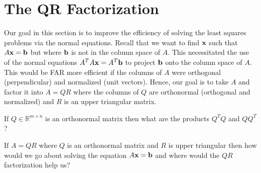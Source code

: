 \newpage\section{The QR Factorization}
Our goal in this section is to improve the efficiency of solving the least squares
problems via the normal equations.  Recall that we want to find ${\bf x}$ such that $A {\bf x} =
{\bf b}$ but where ${\bf b}$ is not in the column space of $A$.  This necessitated the use of the
normal equations $A^T A {\bf x} = A^T {\bf b}$ to project ${\bf b}$ onto the column space of $A$.
This would be FAR more efficient if the columns of $A$ were orthogonal (perpendicular) and
normalized (unit vectors).  Hence, our goal is to take $A$ and factor it into $A = QR$
where the columns of $Q$ are orthonormal (orthogonal and normalized) and $R$ is an upper
triangular matrix.

\begin{problem}
    If $Q \in \mathbb{R}^{m \times n}$ is an orthonormal matrix then what are the products
    $Q^TQ$ and $QQ^T$?  
\end{problem}

\begin{problem}
    If $A  = QR$ where $Q$ is an orthonormal matrix and $R$ is upper triangular then how
    would we go about solving the equation $A{\bf x} = {\bf b}$ and where would the $QR$
    factorization help us?
\end{problem}

